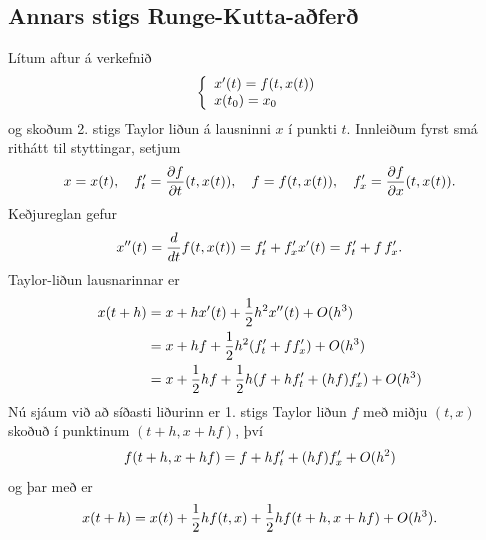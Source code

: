 \documentclass[letterpaper,10pt,icelandic]{sphinxmanual}
\begin{document}
\subsection{Annars stigs Runge-Kutta-aðferð}
\label{kafli06:annars-stigs-runge-kutta-afer}\label{kafli06:index-11}
Lítum aftur á verkefnið
\begin{gather}
\begin{split}\left\{
    \begin{array}{l}
      x'(t) = f(t,x(t)) \\
      x(t_0) = x_0
    \end{array}
  \right.\end{split}\notag
\end{gather}
og skoðum 2. stigs Taylor liðun á lausninni \(x\) í punkti
\(t\). Innleiðum fyrst smá rithátt til styttingar, setjum
\begin{gather}
\begin{split}x = x(t), \quad f'_t = \frac{\partial f}{\partial t}(t,x(t)), \quad
  f = f(t,x(t)), \quad f'_x = \frac{\partial f}{\partial x}(t,x(t)).\end{split}\notag
\end{gather}
Keðjureglan gefur
\begin{gather}
\begin{split}x''(t)=\dfrac d{dt}f(t,x(t))=f'_t+f'_xx'(t)=f'_t+f\,f'_x.\end{split}\notag
\end{gather}
Taylor-liðun lausnarinnar er
\begin{gather}
\begin{split}\begin{aligned}
  x(t+h) &= x + hx'(t) + \frac{1}{2} h^2 x''(t) + O(h^3) \\
  &= x + hf + \frac{1}{2} h^2 ( f'_t + f f'_x ) + O(h^3) \\
  &= x + \frac{1}{2}hf + \frac{1}{2}h( f + hf'_t + (hf)f'_x) + O(h^3)\end{aligned}\end{split}\notag
\end{gather}
Nú sjáum við að síðasti liðurinn er 1. stigs Taylor liðun \(f\) með
miðju \((t,x)\) skoðuð í punktinum \((t+h,x+hf)\), því
\begin{gather}
\begin{split}f(t+h,x + hf) = f + hf'_t + (hf) f'_x + O(h^2)\end{split}\notag
\end{gather}
og þar með er
\begin{gather}
\begin{split}x(t+h) = x(t) + \frac{1}{2} hf(t,x) + \frac{1}{2} hf(t+h,x+hf) + O(h^3).\end{split}\notag
\end{gather}
\end{document}

